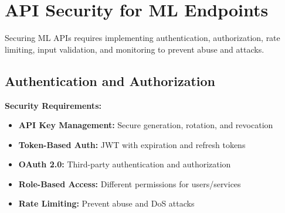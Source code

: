\section{API Security for ML Endpoints}

Securing ML APIs requires implementing authentication, authorization, rate limiting, input validation, and monitoring to prevent abuse and attacks.

\subsection{Authentication and Authorization}

\textbf{Security Requirements:}
\begin{itemize}
    \item \textbf{API Key Management:} Secure generation, rotation, and revocation
    \item \textbf{Token-Based Auth:} JWT with expiration and refresh tokens
    \item \textbf{OAuth 2.0:} Third-party authentication and authorization
    \item \textbf{Role-Based Access:} Different permissions for users/services
    \item \textbf{Rate Limiting:} Prevent abuse and DoS attacks
\end{itemize}

